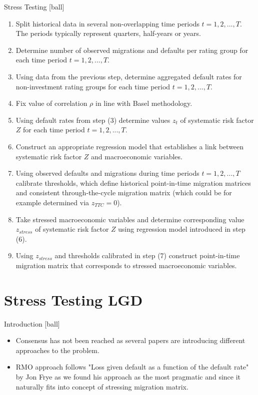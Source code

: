 \documentclass{beamer}
\begin{document}
\begin{frame}{Stress Testing}
[ball]
\begin{enumerate}
	\item Split historical data in several non-overlapping time periods $t = 1, 2, ..., T$. 
	The periods typically represent quarters, half-years or years.
	\item Determine number of observed migrations and defaults per rating group for each time period $t = 1, 2, ..., T$.
	\item Using data from the previous step, determine aggregated default rates 
	for non-investment rating groups for each time period $t = 1, 2, ..., T$.
	\item Fix value of correlation $\rho$ in line with Basel methodology.
	\item Using default rates from step (3) determine values $z_t$ 
	of systematic risk factor $Z$ for each time period $t = 1, 2, ..., T$.
	\item Construct an appropriate regression model that establishes a 
	link between systematic risk factor $Z$ and macroeconomic variables.
	\item Using observed defaults and migrations during time periods $t = 1, 2, ..., T$ calibrate thresholds, which define historical point-in-time 
	migration matrices and consistent through-the-cycle migration matrix (which could be for example determined via $z_{TTC} = 0$).
	\item Take stressed macroeconomic variables and determine corresponding 
	value $z_{stress}$ of systematic risk factor $Z$ using regression model 
	introduced in step (6).
	\item Using $z_{stress}$ and thresholds calibrated in step (7) 
	construct point-in-time migration matrix that corresponds to stressed 
	macroeconomic variables.
\end{enumerate}
\end{frame}

\section{Stress Testing LGD}

\begin{frame}{Introduction}
[ball]
\begin{itemize}
	\item Consensus has not been reached as several papers are introducing different approaches to the problem.
	\item RMO approach follows "Loss given default as a function of the default rate" by Jon Frye as we found his approach as the most pragmatic and
	since it naturally fits into concept of stressing migration matrix.
\end{itemize}
\end{frame}
\end{document}
